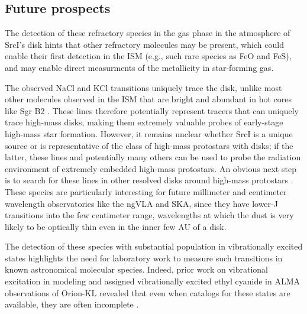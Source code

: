 \documentclass[twocolumn]{aastex62}
\newcommand{\sourcei}{SrcI\xspace}
\begin{document}
\subsection{Future prospects}
The detection of these refractory species in the gas phase in the atmosphere
of \sourcei's disk hints that other refractory molecules may be present, 
which could enable their first detection in the ISM (e.g., such rare species as
FeO and FeS), and may enable direct measurments of the metallicity in
star-forming gas.

The observed NaCl and KCl transitions uniquely trace the disk, unlike most other
molecules observed in the ISM that are bright and abundant in hot cores like
Sgr B2 \citep{Nummelin1998a,Belloche2013a}.  These lines therefore potentially
represent tracers that can uniquely trace high-mass disks, making them extremely
valuable probes of early-stage high-mass star formation.
However, it remains unclear whether \sourcei is a unique source or is
representative of the class of high-mass protostars with disks; if the latter,
these lines and potentially many others can be used to probe the radiation
environment of extremely embedded high-mass protostars.  An obvious next step
is to search for these lines in other resolved disks around high-mass
protostars \citep[e.g.  HH80/81;][]{Girart2017a}.  These species are
particularly interesting for future millimeter and centimeter wavelength
observatories like the ngVLA and SKA, since they have lower-J transitions into
the few centimeter range, wavelengths at which the dust is very likely
to be optically thin even in the inner few AU of a disk.

The detection of these species with substantial population in vibrationally
excited states highlights the need for laboratory work to measure such
transitions in known astronomical molecular species. Indeed, prior work on
vibrational excitation in modeling and assigned vibrationally excited ethyl
cyanide in ALMA observations of Orion-KL revealed that even when catalogs for
these states are available, they are often incomplete \citep{Fortman2012a}.
\end{document}
